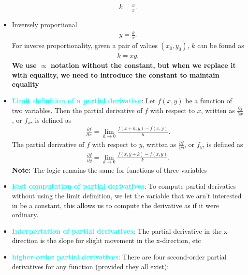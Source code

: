 \documentclass{report}
\begin{document}
\begin{itemize}
\begin{align*}
                    k = \frac{y}{x}
                .\end{align*}
                \item Inversely proportional
                \begin{align*}
                    y = \frac{k}{x}
                .\end{align*}
                For inverse proportionality, given a pair of values $(x_{0}, y_{0})$, $k$ can be found as 
                \begin{align*}
                    k=xy
                .\end{align*}
                \bigbreak \noindent 
                \textbf{We use $\propto$ notation without the constant, but when we replace it with equality, we need to introduce the constant to maintain equality}
            \item \textbf{\textcolor{cyan}{Limit definition of a partial derivative}}:
                Let $f(x,y)$ be a function of two variables. Then the partial derivative of $f$ with respect to $x$, written as $\frac{\partial f}{\partial x}$, or $f_x$, is defined as
                \begin{align*}
                    \frac{\partial f}{\partial x} = \lim_{h \to 0} \frac{f(x+h,y) - f(x,y)}{h}
                .\end{align*}
                The partial derivative of $f$ with respect to $y$, written as $\frac{\partial f}{\partial y}$, or $f_y$, is defined as
                \begin{align*}
                    \frac{\partial f}{\partial y} = \lim_{k \to 0} \frac{f(x,y+k) - f(x,y)}{k}
                .\end{align*}
                \bigbreak \noindent 
                \textbf{Note:} The logic remains the same for functions of three variables
            \item \textbf{\textcolor{cyan}{Fast computation of partial derivatives}}: To compute partial derivaties without using the limit definition, we let the variable that we arn't interested in be a constant, this allows us to compute the derivative as if it were ordinary.
            \item \textbf{\textcolor{cyan}{Interpertation of partial derivatives}}: The partial derivative in the x-direction is the slope for slight movement in the x-direction, etc
            \item \textbf{\textcolor{cyan}{higher-order partial derivatives}}:
                There are four second-order partial derivatives for any function (provided they all exist):

\end{itemize}
\end{document}
